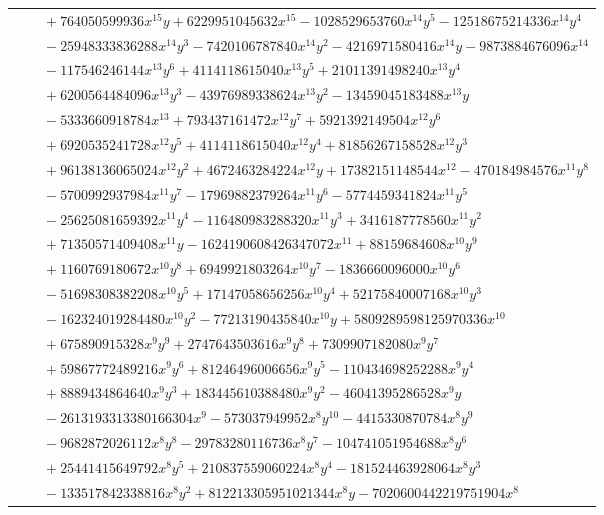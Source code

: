 \documentclass[11pt]{article}
\begin{document}
\begin{longtable}{@{}ll@{}}
 & $\quad +764050599936x^{15}y+6229951045632x^{15}-1028529653760x^{14}y^{5}-12518675214336x^{14}y^{4}$\\
 & $\quad -25948333836288x^{14}y^{3}-7420106787840x^{14}y^{2}-4216971580416x^{14}y-9873884676096x^{14}$\\
 & $\quad -117546246144x^{13}y^{6}+4114118615040x^{13}y^{5}+21011391498240x^{13}y^{4}$\\
 & $\quad +6200564484096x^{13}y^{3}-43976989338624x^{13}y^{2}-13459045183488x^{13}y$\\
 & $\quad -5333660918784x^{13}+793437161472x^{12}y^{7}+5921392149504x^{12}y^{6}$\\
 & $\quad +6920535241728x^{12}y^{5}+4114118615040x^{12}y^{4}+81856267158528x^{12}y^{3}$\\
 & $\quad +96138136065024x^{12}y^{2}+4672463284224x^{12}y+17382151148544x^{12}-470184984576x^{11}y^{8}$\\
 & $\quad -5700992937984x^{11}y^{7}-17969882379264x^{11}y^{6}-5774459341824x^{11}y^{5}$\\
 & $\quad -25625081659392x^{11}y^{4}-116480983288320x^{11}y^{3}+3416187778560x^{11}y^{2}$\\
 & $\quad +71350571409408x^{11}y-1624190608426347072x^{11}+88159684608x^{10}y^{9}$\\
 & $\quad +1160769180672x^{10}y^{8}+6949921803264x^{10}y^{7}-1836660096000x^{10}y^{6}$\\
 & $\quad -51698308382208x^{10}y^{5}+17147058656256x^{10}y^{4}+52175840007168x^{10}y^{3}$\\
 & $\quad -162324019284480x^{10}y^{2}-77213190435840x^{10}y+5809289598125970336x^{10}$\\
 & $\quad +675890915328x^{9}y^{9}+2747643503616x^{9}y^{8}+7309907182080x^{9}y^{7}$\\
 & $\quad +59867772489216x^{9}y^{6}+81246496006656x^{9}y^{5}-110434698252288x^{9}y^{4}$\\
 & $\quad +8889434864640x^{9}y^{3}+183445610388480x^{9}y^{2}-46041395286528x^{9}y$\\
 & $\quad -2613193313380166304x^{9}-573037949952x^{8}y^{10}-4415330870784x^{8}y^{9}$\\
 & $\quad -9682872026112x^{8}y^{8}-29783280116736x^{8}y^{7}-104741051954688x^{8}y^{6}$\\
 & $\quad +25441415649792x^{8}y^{5}+210837559060224x^{8}y^{4}-181524463928064x^{8}y^{3}$\\
 & $\quad -133517842338816x^{8}y^{2}+812213305951021344x^{8}y-7020600442219751904x^{8}$\\

\end{longtable}
\end{document}
